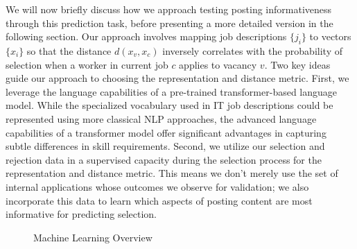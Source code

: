 We will now briefly discuss how we approach testing posting informativeness through this prediction task, before presenting a more detailed version in the following section. Our approach involves mapping job descriptions \(\{j_i\}\) to vectors \(\{x_i\}\) so that the distance \(d(x_v, x_c)\) inversely correlates with the probability of selection when a worker in current job \(c\) applies to vacancy \(v\). Two key ideas guide our approach to choosing the representation and distance metric. First, we leverage the language capabilities of a pre-trained transformer-based language model. While the specialized vocabulary used in IT job descriptions could be represented using more classical NLP approaches, the advanced language capabilities of a transformer model offer significant advantages in capturing subtle differences in skill requirements. Second, we utilize our selection and rejection data in a supervised capacity during the selection process for the representation and distance metric. This means we don't merely use the set of internal applications whose outcomes we observe for validation; we also incorporate this data to learn which aspects of posting content are most informative for predicting selection.


\begin{figure} %
    \centering %
    \caption{Machine Learning Overview} %
    \label{fig:ml_pipeline} %
\end{figure}

